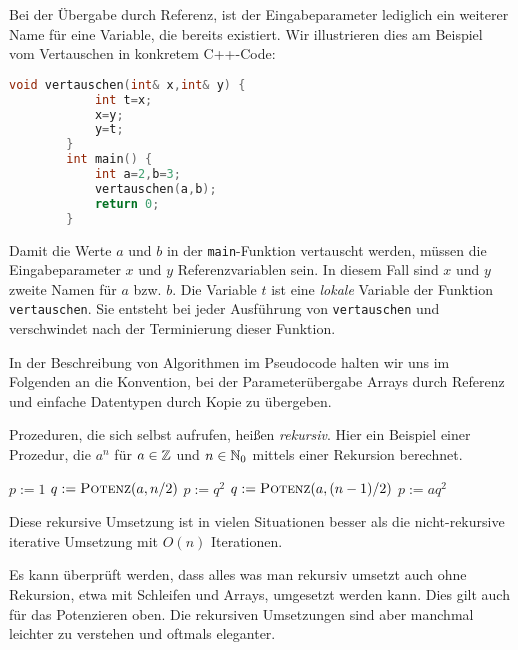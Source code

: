 \begin{bem} 
Bei der Übergabe durch Referenz, ist der Eingabeparameter lediglich ein weiterer Name für eine Variable, die bereits existiert. Wir illustrieren dies am Beispiel vom Vertauschen in konkretem C++-Code: 

\begin{center}
	\small 
	\begin{lstlisting}[language=C++]
		void vertauschen(int& x,int& y) {
			int t=x;
			x=y;
			y=t;
		}
		int main() {
			int a=2,b=3;
			vertauschen(a,b);
			return 0;
		}
	\end{lstlisting}
\end{center}

Damit die Werte $a$ und $b$ in der \texttt{main}-Funktion vertauscht werden, müssen die Eingabeparameter $x$ und $y$ Referenzvariablen sein. In diesem Fall sind $x$ und $y$ zweite Namen für $a$ bzw. $b$. Die Variable $t$ ist eine \emph{lokale} Variable der Funktion \texttt{vertauschen}. Sie entsteht bei jeder Ausführung von \texttt{vertauschen} und verschwindet nach der Terminierung dieser Funktion. 
\end{bem} 

\begin{bem}
	In der Beschreibung von Algorithmen im Pseudocode halten wir uns im Folgenden an die Konvention, bei der Parameterübergabe Arrays durch Referenz und einfache Datentypen durch Kopie zu übergeben.
\end{bem}


\begin{bem}
Prozeduren, die sich selbst aufrufen, heißen \emph{rekursiv}. Hier ein Beispiel einer Prozedur, die $a^n$ für $a \in \mathbb{Z}$ und $n \in \mathbb{N}_0$ mittels einer Rekursion berechnet.
\begin{algorithm}[H]
	\caption{$p:=\cc{Potenz}(a,n)$}
	\begin{algorithmic}
		\STATE $p:=1$
		\STATE $q:=\mathop{\text{\textsc{Potenz}}}(a,n/2)$
		\STATE $p:= q^2$
		\ELSE
		\STATE $q:=\mathop{\text{\textsc{Potenz}}}(a,(n-1)/2)$
		\STATE $p:= a q^2$
		\ENDIF
	\end{algorithmic}
\end{algorithm}
Diese rekursive Umsetzung ist in vielen Situationen besser als die nicht-rekursive iterative Umsetzung mit $O(n)$ Iterationen. 
\end{bem} 


\begin{bem}
Es kann überprüft werden, dass alles was man rekursiv umsetzt auch ohne Rekursion, etwa mit Schleifen und Arrays, umgesetzt werden kann. Dies gilt auch für das Potenzieren oben. Die rekursiven Umsetzungen sind aber manchmal leichter zu verstehen und oftmals eleganter. 
\end{bem} 


